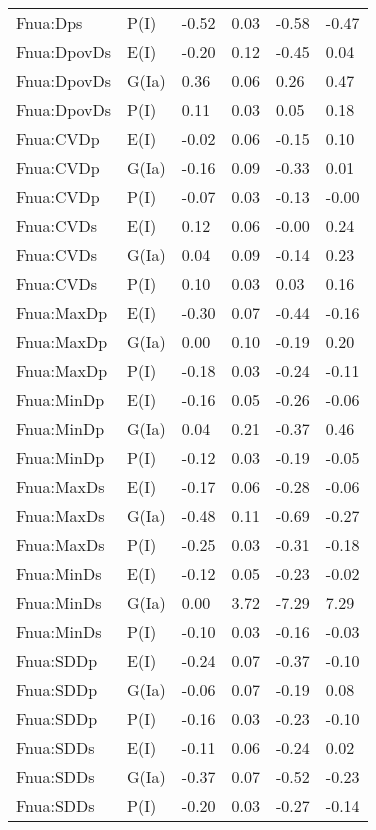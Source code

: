 \begin{center}
\begin{longtable}{|p{1.1in}|p{0.7in}|p{0.7in}|p{0.6in}|p{0.6in}|p{0.6in}|}
  Fnua:Dps & P(I) & -0.52 & 0.03 & -0.58 & -0.47 \\ 
  Fnua:DpovDs & E(I) & -0.20 & 0.12 & -0.45 & 0.04 \\ 
  Fnua:DpovDs & G(Ia) & 0.36 & 0.06 & 0.26 & 0.47 \\ 
  Fnua:DpovDs & P(I) & 0.11 & 0.03 & 0.05 & 0.18 \\ 
  Fnua:CVDp & E(I) & -0.02 & 0.06 & -0.15 & 0.10 \\ 
  Fnua:CVDp & G(Ia) & -0.16 & 0.09 & -0.33 & 0.01 \\ 
  Fnua:CVDp & P(I) & -0.07 & 0.03 & -0.13 & -0.00 \\ 
  Fnua:CVDs & E(I) & 0.12 & 0.06 & -0.00 & 0.24 \\ 
  Fnua:CVDs & G(Ia) & 0.04 & 0.09 & -0.14 & 0.23 \\ 
  Fnua:CVDs & P(I) & 0.10 & 0.03 & 0.03 & 0.16 \\ 
  Fnua:MaxDp & E(I) & -0.30 & 0.07 & -0.44 & -0.16 \\ 
  Fnua:MaxDp & G(Ia) & 0.00 & 0.10 & -0.19 & 0.20 \\ 
  Fnua:MaxDp & P(I) & -0.18 & 0.03 & -0.24 & -0.11 \\ 
  Fnua:MinDp & E(I) & -0.16 & 0.05 & -0.26 & -0.06 \\ 
  Fnua:MinDp & G(Ia) & 0.04 & 0.21 & -0.37 & 0.46 \\ 
  Fnua:MinDp & P(I) & -0.12 & 0.03 & -0.19 & -0.05 \\ 
  Fnua:MaxDs & E(I) & -0.17 & 0.06 & -0.28 & -0.06 \\ 
  Fnua:MaxDs & G(Ia) & -0.48 & 0.11 & -0.69 & -0.27 \\ 
  Fnua:MaxDs & P(I) & -0.25 & 0.03 & -0.31 & -0.18 \\ 
  Fnua:MinDs & E(I) & -0.12 & 0.05 & -0.23 & -0.02 \\ 
  Fnua:MinDs & G(Ia) & 0.00 & 3.72 & -7.29 & 7.29 \\ 
  Fnua:MinDs & P(I) & -0.10 & 0.03 & -0.16 & -0.03 \\ 
  Fnua:SDDp & E(I) & -0.24 & 0.07 & -0.37 & -0.10 \\ 
  Fnua:SDDp & G(Ia) & -0.06 & 0.07 & -0.19 & 0.08 \\ 
  Fnua:SDDp & P(I) & -0.16 & 0.03 & -0.23 & -0.10 \\ 
  Fnua:SDDs & E(I) & -0.11 & 0.06 & -0.24 & 0.02 \\ 
  Fnua:SDDs & G(Ia) & -0.37 & 0.07 & -0.52 & -0.23 \\ 
  Fnua:SDDs & P(I) & -0.20 & 0.03 & -0.27 & -0.14 \\ 

\end{longtable}
\end{center}
